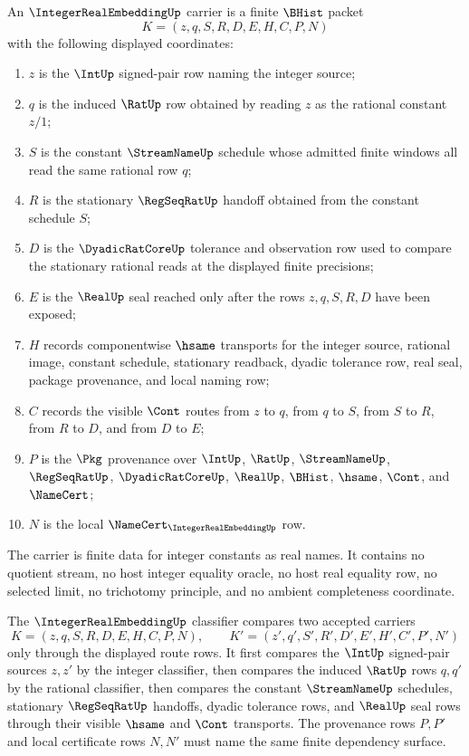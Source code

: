 \begin{definition}
\label{def:integer-real-embedding-carrier}
An $\IntegerRealEmbeddingUp$ carrier is a finite $\BHist$ packet
$$
K=(z,q,S,R,D,E,H,C,P,N)
$$
with the following displayed coordinates:
\begin{enumerate}
\item $z$ is the $\IntUp$ signed-pair row naming the integer source;
\item $q$ is the induced $\RatUp$ row obtained by reading $z$ as the rational constant $z/1$;
\item $S$ is the constant $\StreamNameUp$ schedule whose admitted finite windows all read the same rational row $q$;
\item $R$ is the stationary $\RegSeqRatUp$ handoff obtained from the constant schedule $S$;
\item $D$ is the $\DyadicRatCoreUp$ tolerance and observation row used to compare the stationary rational reads at the displayed finite precisions;
\item $E$ is the $\RealUp$ seal reached only after the rows $z,q,S,R,D$ have been exposed;
\item $H$ records componentwise $\hsame$ transports for the integer source, rational image, constant schedule, stationary readback, dyadic tolerance row, real seal, package provenance, and local naming row;
\item $C$ records the visible $\Cont$ routes from $z$ to $q$, from $q$ to $S$, from $S$ to $R$, from $R$ to $D$, and from $D$ to $E$;
\item $P$ is the $\Pkg$ provenance over $\IntUp$, $\RatUp$, $\StreamNameUp$, $\RegSeqRatUp$, $\DyadicRatCoreUp$, $\RealUp$, $\BHist$, $\hsame$, $\Cont$, and $\NameCert$;
\item $N$ is the local $\NameCert_{\IntegerRealEmbeddingUp}$ row.
\end{enumerate}
The carrier is finite data for integer constants as real names. It contains no quotient stream, no host integer equality oracle, no host real equality row, no selected limit, no trichotomy principle, and no ambient completeness coordinate.
\end{definition}

\begin{definition}
\label{def:integer-real-embedding-classifier}
The $\IntegerRealEmbeddingUp$ classifier compares two accepted carriers
$$
K=(z,q,S,R,D,E,H,C,P,N),\qquad
K'=(z',q',S',R',D',E',H',C',P',N')
$$
only through the displayed route rows. It first compares the $\IntUp$ signed-pair sources $z,z'$ by the integer classifier, then compares the induced $\RatUp$ rows $q,q'$ by the rational classifier, then compares the constant $\StreamNameUp$ schedules, stationary $\RegSeqRatUp$ handoffs, dyadic tolerance rows, and $\RealUp$ seal rows through their visible $\hsame$ and $\Cont$ transports. The provenance rows $P,P'$ and local certificate rows $N,N'$ must name the same finite dependency surface.
\end{definition}

